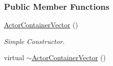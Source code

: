 \subsubsection*{Public Member Functions}
\begin{DoxyCompactItemize}
\item 
\hyperlink{classphys_1_1ActorContainerVector_aafcce4ad4694e7f42a3a7f2c24087688}{ActorContainerVector} ()
\begin{DoxyCompactList}\small\item\em Simple Constructor. \item\end{DoxyCompactList}\item 
\hypertarget{classphys_1_1ActorContainerVector_a0bcc6e728a3ea94532e2c58248b43342}{
virtual \hyperlink{classphys_1_1ActorContainerVector_a0bcc6e728a3ea94532e2c58248b43342}{$\sim$ActorContainerVector} ()}
\label{d3/d64/classphys_1_1ActorContainerVector_a0bcc6e728a3ea94532e2c58248b43342}


\end{DoxyCompactItemize}
